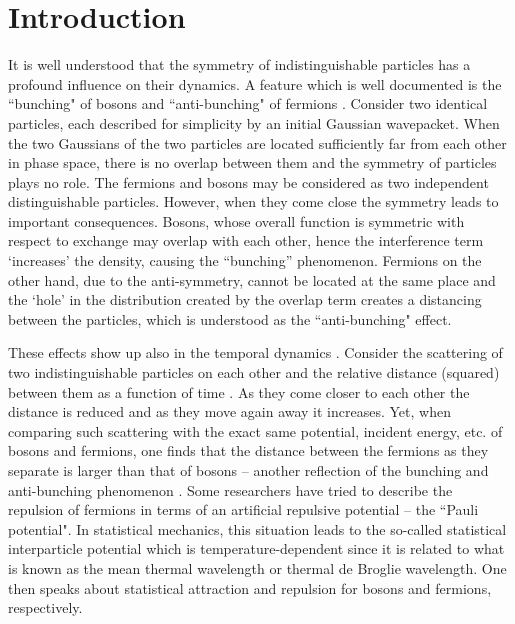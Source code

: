 \documentclass[preprint,aps]{revtex4}
\begin{document}
\renewcommand{\theequation}{1.\arabic{equation}} \setcounter{section}{0} %
\setcounter{equation}{0}




\section{Introduction}

It is well understood that the symmetry of indistinguishable particles has a
profound influence on their dynamics. A feature which is well documented is
the ``bunching" of bosons \cite{brown1956,jeltes2007} and ``anti-bunching" of
fermions \cite{henny1999,oliver1999,kiesel2002,ianuzzi2006,rom2006}.
Consider two identical particles, each described for simplicity by an
initial Gaussian wavepacket. When the two Gaussians of the two particles are
located sufficiently far from each other in phase space, there is no overlap between them
and the symmetry of particles plays no role. The fermions and bosons may be
considered as two independent distinguishable particles. However, when they
come close the symmetry leads to important consequences. Bosons, whose overall function is
symmetric with respect to exchange may overlap with each other, hence the interference term
`increases' the density, causing the ``bunching'' phenomenon. Fermions
on the other hand, due to the anti-symmetry, cannot be located at the same
place and the `hole' in the distribution created by the overlap term creates
a distancing between the particles, which is understood as the
``anti-bunching" effect.

These effects show up also in the temporal dynamics \cite%
{grossmann2014,buchholz2018}. Consider the scattering of two
indistinguishable particles on each other and the relative distance
(squared) between them as a function of time \cite{grossmann2014}. As they
come closer to each other the distance is reduced and as they move again
away it increases. Yet, when comparing such scattering with the exact same
potential, incident energy, etc. of bosons and fermions, one finds that the
distance between the fermions as they separate is larger than that of bosons
-- another reflection of the bunching and anti-bunching phenomenon \cite%
{grossmann2014,buchholz2018}. Some researchers have tried to describe the
repulsion of fermions in terms of an artificial repulsive potential -- the ``Pauli potential". \cite{wilets1977,dorso1987,boal1988,latora1994,gu2016} In statistical mechanics, this situation leads to the so-called statistical interparticle potential which is temperature-dependent since 
it is related to what is known as the mean thermal wavelength or thermal de Broglie wavelength. \cite{Pathria} One then speaks about statistical 
attraction and repulsion for bosons and fermions, respectively. 
\end{document}

